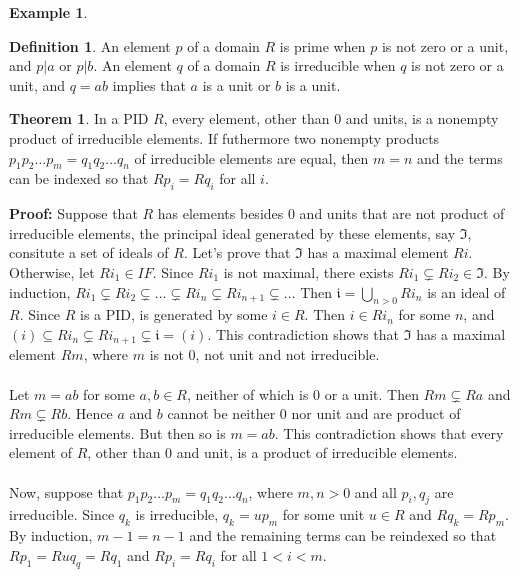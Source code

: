 \documentclass[11pt]{amsbook}%
\theoremstyle{plain}
\theoremstyle{definition}
\newtheorem{definition*}{Definition}
\newtheorem*{example*}{Example}
\newtheorem{theorem}{Theorem}
\numberwithin{equation}{section}
\newcommand{\IF}{\mathfrak I}
\renewcommand{\proof}{ \textbf{Proof: }}
\begin{document}
\begin{example*}
\begin{definition*}
  An element $p$ of a domain $R$ is prime when $p$ is not zero 
  or a unit, and $p|a$ or $p|b$. An element $q$ of a domain $R$
  is irreducible when $q$ is not zero or a unit, and $q = ab$
  implies that $a$ is a unit or $b$ is a unit.
\end{definition*}

\begin{theorem}
  \label{theo-irreducible-elements}
  In a PID $R$, every element, other than $0$ and units, is a nonempty
  product of irreducible elements. If futhermore two nonempty products
  $p_{1}p_{2} \dots p_{m} = q_{1}q_{2} \dots q_{n}$ of irreducible elements are equal,
  then  $m=n$ and the terms can be indexed so that $Rp_{i} = Rq_{i}$ for all $i$.
\end{theorem} \vspace{1.8em}
\proof Suppose that $R$ has elements besides 0 and units that are not
product of irreducible elements, the principal ideal generated by these
elements, say $\IF$, consitute a set of ideals of $R$. Let's prove that
$\IF$ has a maximal element $Ri$. Otherwise, let $Ri_{1} \in IF$. Since
$Ri_{1}$ is not maximal, there exists $Ri_{1} \subsetneq Ri_{2} \in \IF$.
By induction, $Ri_{1} \subsetneq Ri_{2} \subsetneq \dots \subsetneq Ri_{n} \subsetneq Ri_{n+1} \subsetneq \dots$
Then $\mathfrak{i} = \bigcup_{n > 0} Ri_{n}$ is an ideal of $R$. Since $R$
is a PID,  is generated by some $i \in R$. Then $i \in Ri_{n}$
for some $n$, and $(i) \subseteq Ri_{n} \subsetneq Ri_{n+1} \subsetneq \mathfrak{i} = (i)$.
This contradiction shows that $\IF$ has a maximal element $Rm$, where $m$
is not 0, not unit and not irreducible. \\ \\
Let $m = ab$ for some $a, b \in R$, neither of which is 0 or a unit.
Then $Rm \subsetneq Ra$ and $Rm \subsetneq Rb$. Hence $a$ and $b$ cannot be neither
0 nor unit and are product of irreducible elements. But then so is
$m = ab$. This contradiction shows that every element of $R$, other than
0 and unit, is a product of irreducible elements. \\ \\
Now, suppose that $p_{1}p_{2} \dots p_{m} = q_{1}q_{2} \dots q_{n}$, where
$m, n > 0$ and all $p_{i}, q_{j}$ are irreducible. Since $q_{k}$ is
irreducible, $q_{k} = up_{m}$ for some unit $u \in R$ and $Rq_{k} = Rp_{m}$.
By induction, $m-1 = n-1$ and the remaining terms can be reindexed so that
$Rp_{1} = Ruq_{q} = Rq_{1}$ and $Rp_{i} = Rq_{i}$ for all $1 < i < m$. \qedsymbol


\end{example*}
\end{document}

